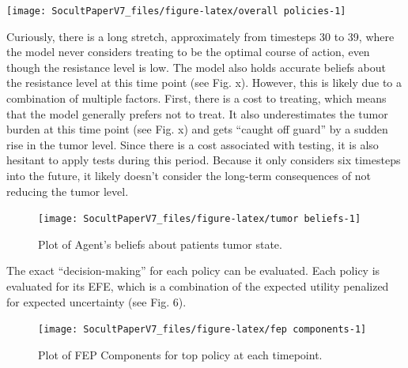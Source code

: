 \documentclass[
]{article}
\begin{document}
\begin{center}\texttt{[image: SocultPaperV7\_files/figure-latex/overall policies-1]} \end{center}

Curiously, there is a long stretch, approximately from timesteps 30 to
39, where the model never considers treating to be the optimal course of
action, even though the resistance level is low. The model also holds
accurate beliefs about the resistance level at this time point (see Fig.
x). However, this is likely due to a combination of multiple factors.
First, there is a cost to treating, which means that the model generally
prefers not to treat. It also underestimates the tumor burden at this
time point (see Fig. x) and gets ``caught off guard'' by a sudden rise
in the tumor level. Since there is a cost associated with testing, it is
also hesitant to apply tests during this period. Because it only
considers six timesteps into the future, it likely doesn't consider the
long-term consequences of not reducing the tumor level.

\begin{figure}

{\centering \texttt{[image: SocultPaperV7\_files/figure-latex/tumor beliefs-1]} 

}

\caption{Plot of Agent's beliefs about patients tumor state.}\label{fig:tumor beliefs}
\end{figure}

The exact ``decision-making'' for each policy can be evaluated. Each
policy is evaluated for its EFE, which is a combination of the expected
utility penalized for expected uncertainty (see Fig. 6).

\begin{figure}

{\centering \texttt{[image: SocultPaperV7\_files/figure-latex/fep components-1]} 

}

\caption{Plot of FEP Components for top policy at each timepoint.}\label{fig:fep components}
\end{figure}
\end{document}
